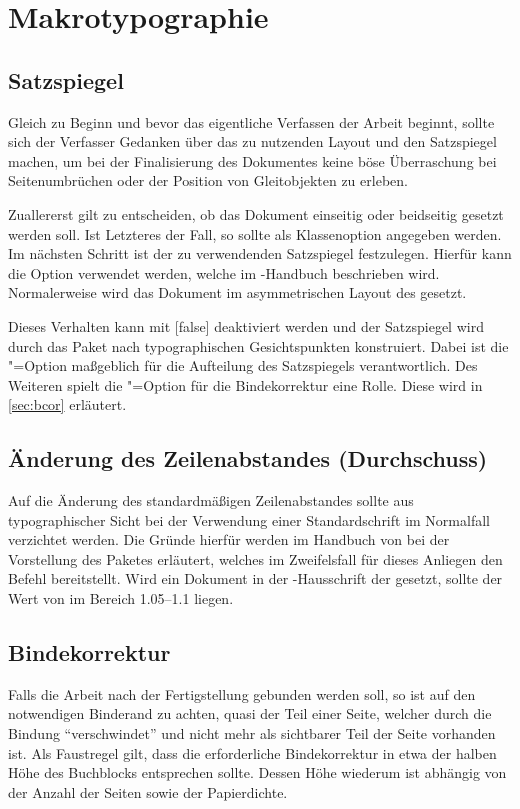 \documentclass[%
  english,ngerman,%
  geometry=no,DIV=12,automark,%
]{tudscrartcl}
\begin{document}
\section{Makrotypographie}
\subsection{Satzspiegel}
Gleich zu Beginn und bevor das eigentliche Verfassen der Arbeit beginnt, sollte 
sich der Verfasser Gedanken über das zu nutzenden Layout und den Satzspiegel 
machen, um bei der Finalisierung des Dokumentes keine böse Überraschung bei 
Seitenumbrüchen oder der Position von Gleitobjekten zu erleben.

Zuallererst gilt zu entscheiden, ob das Dokument einseitig oder beidseitig 
gesetzt werden soll. Ist Letzteres der Fall, so sollte  als 
Klassenoption angegeben werden. Im nächsten Schritt ist der zu verwendenden 
Satzspiegel festzulegen. Hierfür kann die Option  verwendet 
werden, welche im \TUDScript-Handbuch beschrieben wird. Normalerweise wird das 
Dokument im asymmetrischen Layout des \CDs gesetzt.

Dieses Verhalten kann mit [false] deaktiviert werden und der 
Satzspiegel wird durch das Paket  nach typographischen 
Gesichtspunkten konstruiert. Dabei ist die \KOMAScript"=Option  
maßgeblich für die Aufteilung des Satzspiegels verantwortlich. Des Weiteren 
spielt die \KOMAScript"=Option  für die Bindekorrektur eine Rolle. 
Diese wird in \autoref{sec:bcor} erläutert.

\subsection{Änderung des Zeilenabstandes (Durchschuss)}
Auf die Änderung des standardmäßigen Zeilenabstandes sollte aus typographischer 
Sicht bei der Verwendung einer Standardschrift im Normalfall verzichtet werden. 
Die Gründe hierfür werden im Handbuch von \TUDScript bei der Vorstellung des 
Paketes  erläutert, welches im Zweifelsfall für dieses 
Anliegen den Befehl  bereitstellt. Wird ein Dokument in der 
\Univers-Hausschrift der \TnUD gesetzt, sollte der Wert von  
im Bereich 1.05--1.1 liegen.

\subsection{Bindekorrektur}
\label{sec:bcor}
Falls die Arbeit nach der Fertigstellung gebunden werden soll, so ist auf den 
notwendigen Binderand zu achten, quasi der Teil einer Seite, welcher durch die 
Bindung \enquote{verschwindet} und nicht mehr als sichtbarer Teil der Seite 
vorhanden ist. Als Faustregel gilt, dass die erforderliche Bindekorrektur in 
etwa der halben Höhe des Buchblocks entsprechen sollte. Dessen Höhe wiederum 
ist abhängig von der Anzahl der Seiten sowie der Papierdichte.
\end{document}
